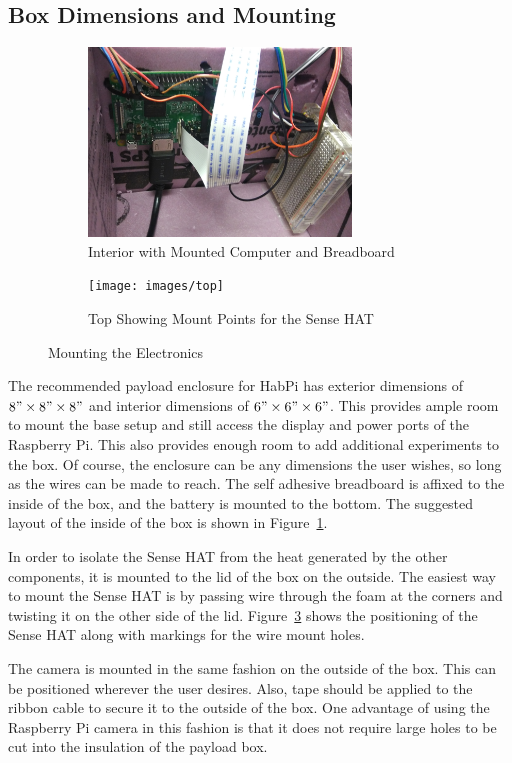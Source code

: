 \documentclass[journal]{new-aiaa}
\begin{document}
\subsection{Box Dimensions and Mounting}
\begin{figure}
    \centering
    \begin{subfigure}{0.45\textwidth}
        \includegraphics[width=2.75in]{images/interior}
        \caption{Interior with Mounted Computer and Breadboard}
        \label{fig:interior}
    \end{subfigure}
    \begin{subfigure}{0.45\textwidth}
        \texttt{[image: images/top]}
        \caption{Top Showing Mount Points for the Sense HAT}
        \label{fig:top}
    \end{subfigure}
    \caption{Mounting the Electronics}
\end{figure}
The recommended payload enclosure for HabPi has exterior dimensions of
$8"\times8"\times8"$ and interior dimensions of $6"\times6"\times6"$.
This provides ample room to mount the base setup and still access the
display and power ports of the Raspberry Pi.  This also provides
enough room to add additional experiments to the box.  Of course, the
enclosure can be any dimensions the user wishes, so long as the wires
can be made to reach.  The self adhesive breadboard is affixed to the
inside of the box, and the battery is mounted to the bottom.  The
suggested layout of the inside of the box is shown in
Figure~\ref{fig:interior}.

In order to isolate the Sense HAT from the heat generated by the other
components, it is mounted to the lid of the box on the outside.  The
easiest way to mount the Sense HAT is by passing wire through the foam
at the corners and twisting it on the other side of the lid.
Figure~\ref{fig:top} shows the positioning of the Sense HAT along with
markings for the wire mount holes.

The camera is mounted in the same fashion on the outside of the box.
This can be positioned wherever the user desires.  Also, tape should be
applied to the ribbon cable to secure it to the outside of the box.
One advantage of using the Raspberry Pi camera in this fashion is that
it does not require large holes to be cut into the insulation of the
payload box.
\end{document}
